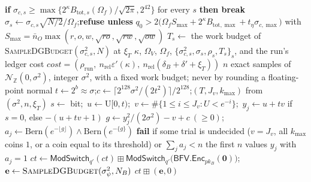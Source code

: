 \documentclass[11pt]{article}
\theoremstyle{definition}
\theoremstyle{plain}
\newcommand{\Rp}{\mathsf{R}}
\newcommand{\Z}{\mathbb{Z}}
\newcommand{\DG}{\mathcal{N}_{\Z}}
\begin{document}
\begin{algorithm}[h]
\begin{algorithmic}[1]
    \State \textbf{if} $\sigma_{c,s}\ge\max\{2^{\kappa}B_{\mathrm{tot},s}(\Omega_f)/\sqrt{2\pi},2^{42}\}$ for every $s$ \textbf{then break} 
  \EndFor {}
  \State $\sigma_s\gets\sigma_{c,s}\sqrt{N/2}/\Omega_f$;\quad \textbf{refuse unless} $q_0>2\bigl(\Omega_fS_{\max}+2^{\kappa}B_{\mathrm{tot},\max}+t_\eta\sigma_{c,\max}\bigr)$
  \Statex \hspace{\algorithmicindent}with $S_{\max}=\bar n_O\max(r,o,w,\sqrt{ro},\sqrt{rw},\sqrt{ow})$ 
  \State $T_s\gets$ the work budget of \textsc{SampleDGBudget}$(\sigma_{c,s}^2,N)$ at $\xi_T$ \Comment{public; checked by $\Rp$}
  \State \Return $\kappa$, $\Omega_V$, $\Omega_f$, $\{\sigma_{c,s}^2,\sigma_s,\rho_s,T_s\}_s$, and the run's ledger cost $\mathit{cost}=(\rho_{\mathrm{run}},\ n_{\mathrm{rel}}\varepsilon'(\kappa),\ n_{\mathrm{rel}}(\delta_B+\delta'+\xi_T))$
\EndFunction
{} $n$ exact samples of $\DG(0,\sigma^2)$, integer $\sigma^2$, with a fixed work budget; never by rounding a floating-point normal
  \State $t\gets2^b\approx\sigma$;\quad $c\gets\lceil2^{128}\sigma^2/(2t^2)\rceil/2^{128}$;\quad $(T,J_v,k_{\max})$ from $(\sigma^2,n,\xi_T)$ 
   
    \State $s\gets$ bit;\ $u\gets\mathrm U[0,t)$;\ $v\gets\#\{1\le i\le J_v:U<e^{-i}\}$;\ $y_j\gets u+tv$ if $s=0$, else $-(u+tv+1)$
    \State $g\gets y_j^2/(2\sigma^2)-v+c\ (\ge0)$;\ $a_j\gets\mathrm{Bern}(e^{-\lfloor g\rfloor})\wedge\mathrm{Bern}(e^{-\{g\}})$ 
  \EndFor
  \State \textbf{fail} if some trial is undecided ($v=J_v$, all $k_{\max}$ coins $1$, or a coin equal to its threshold) or $\sum_ja_j<n$
  \State \Return the first $n$ values $y_j$ with $a_j=1$ 
\EndFunction
{} 
  \State $\mathit{ct}\gets\mathsf{ModSwitch}_{q'}(\mathit{ct})\boxplus\mathsf{ModSwitch}_{q'}\bigl(\mathsf{BFV.Enc}_{pk_B}(\mathbf 0)\bigr)$;\quad $\mathbf e\gets\textsc{SampleDGBudget}(\sigma_\psi^2,N_B)$ 
  \State \Return $\mathit{ct}\boxplus(\mathbf e,0)$ 
\EndFunction
{} 

\end{algorithmic}
\end{algorithm}
\end{document}
